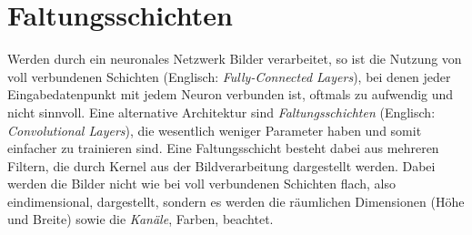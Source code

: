 	\section{Faltungsschichten}
		Werden durch ein neuronales Netzwerk Bilder verarbeitet, so ist die Nutzung von voll verbundenen Schichten (Englisch: \emph{Fully-Connected Layers}), bei denen jeder Eingabedatenpunkt mit jedem Neuron verbunden ist, oftmals zu aufwendig und nicht sinnvoll. Eine alternative Architektur sind \emph{Faltungsschichten} (Englisch: \emph{Convolutional Layers}), die wesentlich weniger Parameter haben und somit einfacher zu trainieren sind. Eine Faltungsschicht besteht dabei aus mehreren Filtern, die durch Kernel aus der Bildverarbeitung dargestellt werden. Dabei werden die Bilder nicht wie bei voll verbundenen Schichten flach, also eindimensional, dargestellt, sondern es werden die räumlichen Dimensionen (Höhe und Breite) sowie die \emph{Kanäle}, \bspw Farben, beachtet.

